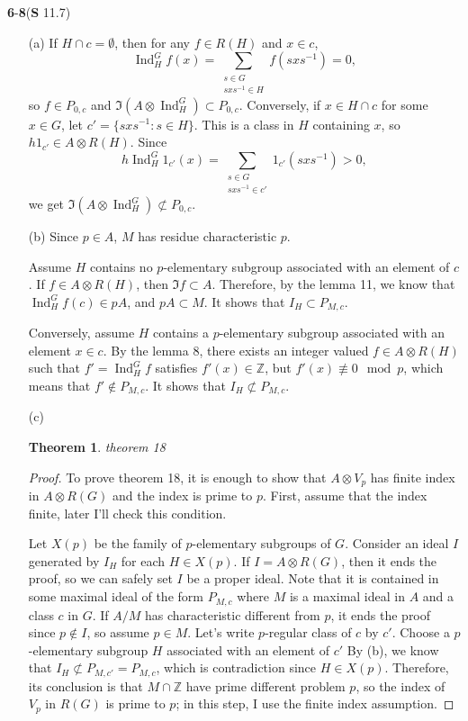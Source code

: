 \documentclass[a4paper, 12pt]{article}
\theoremstyle{Mydefinition}
\theoremstyle{Mytheorem}
\newtheorem{theorem}[statement]{Theorem}
\DeclareMathOperator{\Ind}{Ind}
\begin{document}
\noindent \textbf{6}-\textbf{8}(\textbf{S} 11.7)
\begin{enumerate}
    \item[(a)] If $H\cap c =\emptyset$, then for any $f\in R(H)$ and $x\in c$,
    \begin{equation}
         \Ind_H^G f(x) = \sum_{\substack{s\in G\\ sxs^{-1}\in H}} f(sxs^{-1}) = 0,
    \end{equation}
    so $f\in P_{0,c}$ and $\Im (A\otimes \Ind_H^G)\subset P_{0,c}$. Conversely, if $x\in H\cap c$ for some $x\in G$, let $c' = \{sxs^{-1}:s\in H\}$. This is a class in $H$ containing $x$, so $h1_{c'}\in A\otimes R(H)$. Since
    \begin{equation}
        h\Ind_H^G 1_{c'}(x) = \sum_{\substack{s\in G\\sxs^{-1}\in c'}}1_{c'}(sxs^{-1})>0,
    \end{equation}
    we get $\Im(A\otimes \Ind_H^G)\not\subset P_{0,c}$.
    
    \item[(b)] Since $p\in A$, $M$ has residue characteristic $p$.
    
    Assume $H$ contains no $p$-elementary subgroup associated with an element of $c$. If $f\in A\otimes R(H)$, then $\Im f\subset A$. Therefore, by the lemma 11, we know that $\Ind_H^G f(c)\in pA$, and $pA\subset M$. It shows that $I_H\subset P_{M,c}$.
    
    Conversely, assume $H$ contains a $p$-elementary subgroup associated with an element $x\in c$. By the lemma 8, there exists an integer valued $f\in A\otimes R(H)$ such that $f' = \Ind_H^G f$ satisfies $f'(x)\in \mathbb{Z}$, but $f'(x)\not\equiv 0\mod p$, which means that $f'\not\in P_{M,c}$. It shows that $I_H\not\subset P_{M,c}$.
    \item[(c)]
    \begin{theorem}
    theorem 18
    \end{theorem}
    \begin{proof}
    To prove theorem 18, it is enough to show that $A\otimes V_p$ has finite index in $A\otimes R(G)$ and the index is prime to $p$. First, assume that the index finite, later I'll check this condition.
    
    Let $X(p)$ be the family of $p$-elementary subgroups of $G$. Consider an ideal $I$ generated by $I_H$ for each $H\in X(p)$. If $I=A\otimes R(G)$, then it ends the proof, so we can safely set $I$ be a proper ideal. Note that it is contained in some maximal ideal of the form $P_{M,c}$ where $M$ is a maximal ideal in $A$ and a class $c$ in $G$. If $A/M$ has characteristic different from $p$, it ends the proof since $p\not\in I$, so assume $p\in M$. Let's write $p$-regular class of $c$ by $c'$. Choose a $p$-elementary subgroup $H$ associated with an element of $c'$ By (b), we know that $I_H\not\subset P_{M, c'} = P_{M,c}$, which is contradiction since $H\in X(p)$. Therefore, its conclusion is that $M\cap \mathbb{Z}$ have prime different problem $p$, so the index of $V_p$ in $R(G)$ is prime to $p$; in this step, I use the finite index assumption.
    

\end{proof}
\end{enumerate}
\end{document}
